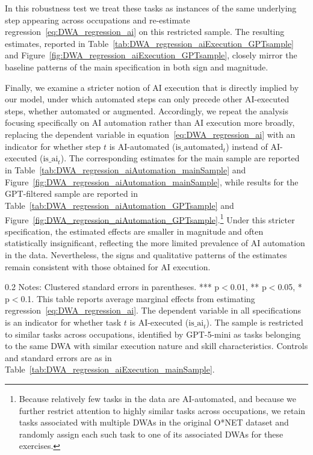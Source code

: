 In this robustness test we treat these tasks as instances of the same underlying step appearing across occupations and re-estimate regression~\eqref{eq:DWA_regression_ai} on this restricted sample.
The resulting estimates, reported in Table~\ref{tab:DWA_regression_aiExecution_GPTsample} and Figure~\ref{fig:DWA_regression_aiExecution_GPTsample}, closely mirror the baseline patterns of the main specification in both sign and magnitude.

Finally, we examine a stricter notion of AI execution that is directly implied by our model, under which automated steps can only precede other AI-executed steps, whether automated or augmented.
Accordingly, we repeat the analysis focusing specifically on AI automation rather than AI execution more broadly, replacing the dependent variable in equation~\eqref{eq:DWA_regression_ai} with an indicator for whether step $t$ is AI-automated ($\text{is\_automated}_{t}$) instead of AI-executed ($\text{is\_ai}_{t}$).
The corresponding estimates for the main sample are reported in Table~\ref{tab:DWA_regression_aiAutomation_mainSample} and Figure~\ref{fig:DWA_regression_aiAutomation_mainSample}, while results for the GPT-filtered sample are reported in Table~\ref{tab:DWA_regression_aiAutomation_GPTsample} and Figure~\ref{fig:DWA_regression_aiAutomation_GPTsample}.\footnote{
Because relatively few tasks in the data are AI-automated, and because we further restrict attention to highly similar tasks across occupations, we retain tasks associated with multiple DWAs in the original O*NET dataset and randomly assign each such task to one of its associated DWAs for these exercises.
}
Under this stricter specification, the estimated effects are smaller in magnitude and often statistically insignificant, reflecting the more limited prevalence of AI automation in the data. Nevertheless, the signs and qualitative patterns of the estimates remain consistent with those obtained for AI execution.


\begin{table}[!t]
\centering
\caption{Effect of Neighboring Tasks' AI Execution Status on Task's AI Execution Likelihood (GPT-filtered Sample)}
\label{tab:DWA_regression_aiExecution_GPTsample}
    \footnotesize
\resizebox{\textwidth}{!}{

}
\begin{minipage}{1\linewidth}
\begin{spacing}{0.2}
{\fontsize{9.5pt}{10pt}\selectfont Notes: Clustered standard errors in parentheses. *** p$<$0.01, ** p$<$0.05, * p$<$0.1.
This table reports average marginal effects from estimating regression~\eqref{eq:DWA_regression_ai}.
The dependent variable in all specifications is an indicator for whether task $t$ is AI-executed ($\text{is\_ai}_{t}$).
The sample is restricted to similar tasks across occupations, identified by GPT-5-mini as tasks belonging to the same DWA with similar execution nature and skill characteristics.
Controls and standard errors are as in Table~\ref{tab:DWA_regression_aiExecution_mainSample}.}
\end{spacing}
\end{minipage}\end{table}

